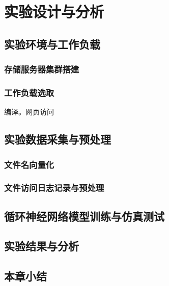 \chapter{实验设计与分析}

\section{实验环境与工作负载}
\subsection{存储服务器集群搭建}
\subsection{工作负载选取}
编译。网页访问

\section{实验数据采集与预处理}
\subsection{文件名向量化}
\subsection{文件访问日志记录与预处理}

\section{循环神经网络模型训练与仿真测试}
\section{实验结果与分析}
\section{本章小结}